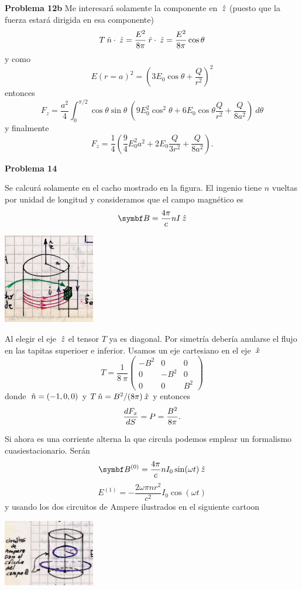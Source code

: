 \documentclass[10pt,oneside]{CBFT_book}
\begin{document}
\begin{ejemplo}{\bf Problema 12b}
Me interesará solamente la componente en $\:\hat{z}$ (puesto que la fuerza estará
dirigida en esa componente)
\[
	T\:\hat{n} \cdot \:\hat{z} = \frac{E^2}{8\pi}\:\hat{r} \cdot \:\hat{z} = 
	\frac{E^2}{8\pi}\cos\theta
\]
y como 
\[
	E(r=a)^2 = \left( 3E_0\cos\theta+\frac{Q}{r^2} \right)^2
\]
entonces
\[
	F_z = \frac{a^2}{4} \int_0^{\pi/2} \cos\theta\sin\theta \: 
	\left( 9E_0^2\cos^2\theta + 6E_0\cos\theta \frac{Q}{r^2} + 
	\frac{Q}{8a^2} \right) \: d\theta
\]
y finalmente
\[
	F_z = \frac{1}{4} \left( \frac 9 4 E_0^2 a^2 +
	2 E_0 \frac{Q}{3r^2} + \frac{Q}{8a^2} \right).
\]
 
\end{ejemplo}

\begin{ejemplo}{\bf Problema 14}

Se calcurá solamente en el cacho mostrado en la figura. El ingenio tiene $n$ vueltas por
unidad de longitud y consideramos que el campo magnético es
\[
	\vb{B} = \frac{4\pi}{c} n I \zver
\]

\includegraphics[width=0.3\textwidth]{images/fig_ft1_problema14A.jpg}

Al elegir el eje $\:\hat{z}$ el tensor $T$ ya es diagonal. Por simetría debería anularse
el flujo en las tapitas superioer e inferior. Usamos un eje cartesiano en el eje $\:\hat{x}$
\[
	T = \frac{1}{8\:\pi}\begin{pmatrix}
	        -B^2  & 0 & 0 \\
		0 & -B^2 & 0 \\
		0	& 0	& B^2
	       \end{pmatrix}		
\]
donde $\:\hat{n} = (-1,0,0)$ y $T\:\hat{n} = B^2/(8\pi) \:\hat{x} $ y entonces
\[
	\frac{d^{\hspace{-0.05em}} {F_x}}{d {S}^{\hspace{-0.05em}}} = P = \frac{B^2}{8\pi}.
\]

Si ahora es una corriente alterna la que circula podemos emplear un formalismo
cuasiestacionario. Serán
\[
	\vb{B}^{(0)} = \frac{4\pi}{c} n I_0 \sin(\omega t) \zver
\]
\[
	E^{(1)} = - \frac{2\omega \pi n r^2}{c^2} I_0 \cos(\omega t) 
\]
y usando los dos circuitos de Ampere ilustrados en el siguiente cartoon

\includegraphics[width=0.3\textwidth]{images/fig_ft1_problema14B.jpg}


\end{ejemplo}
\end{document}
